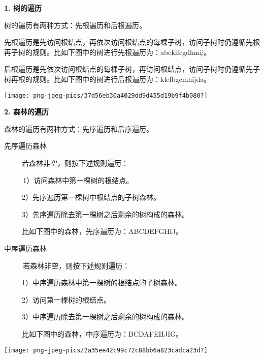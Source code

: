 {\textbf{1. 树的遍历}}{}

{树的遍历有两种方式：先根遍历和后根遍历。}

{{先根遍历}是先访问根结点，再依次访问根结点的每棵子树，访问子树时仍遵循先根再子树的规则。比如下图中的树进行先根遍历为：abeklfcgdhmij。}{}

{{后根遍历}是先依次访问根结点的每棵子树，再访问根结点，访问子树时仍遵循先子树再根的规则。比如下图中的树进行后根遍历为：klefbgcmhijda。}{}

{\texttt{[image: png-jpeg-pics/37d56eb30a4029dd9d455d19b9f4b080?]}}

{\textbf{2. 森林的遍历}}

{森林的遍历有两种方式：先序遍历和后序遍历。}

{先序遍历森林}

{~ ~ ~ 若森林非空，则按下述规则遍历：}

{~ ~ ~~1）访问森林中第一棵树的根结点。}

{~ ~ ~ 2）先序遍历第一棵树中根结点的子树森林。}

{~ ~ ~ 3）先序遍历除去第一棵树之后剩余的树构成的森林。}

{~ ~ ~ 比如下图中的森林，先序遍历为：ABCDEFGHIJ。}

{中序遍历森林}

{~ ~ ~~若森林非空，则按下述规则遍历：}

{~ ~ ~ 1）中序遍历森林中第一棵树的根结点的子树森林。}

{~ ~ ~ 2）访问第一棵树的根结点。}

{~ ~ ~ 3）中序遍历除去第一棵树之后剩余的树构成的森林。}

{~ ~ ~ 比如下图中的森林，中序遍历为：BCDAFEHJIG。}

{\texttt{[image: png-jpeg-pics/2a35ee42c99c72c88bb6a823cadca23d?]}}
